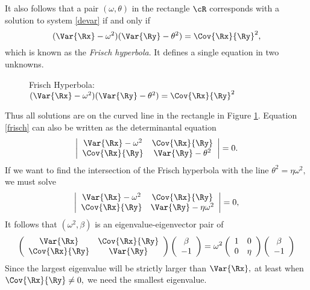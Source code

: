\documentclass[11pt]{report}
\begin{document}
It also follows that a pair  $(\omega,\theta)$ 
in the rectangle $\cR$ corresponds
with a solution to system \ref{devar} if and only if
\begin{equation}\label{frisch}
(\Var{\Rx}-\omega^2)(\Var{\Ry}-\theta^2)=\Cov{\Rx}{\Ry}^2,
\end{equation}
which is known as the \textit{Frisch hyperbola}. It defines a single equation
in two unknowns. 
\begin{figure}
   \centering
   \centerline{}
   \caption{Frisch Hyperbola:  $(\Var{\Rx}-\omega^2)(\Var{\Ry}-\theta^2)=
                                \Cov{\Rx}{\Ry}^2$\label{pict1}}
\end{figure}
Thus all solutions are on the curved line in the rectangle
in Figure \ref{pict1}. 
Equation \ref{frisch} can also be written as the determinantal equation
\begin{equation}\label{det}
\begin{array}|{cc}|
\Var{\Rx}-\omega^2&\Cov{\Rx}{\Ry}\\
\Cov{\Rx}{\Ry}&\Var{\Ry}-\theta^2
\end{array}
=0.
\end{equation}
If we want to find the intersection of the Frisch hyperbola with the line $\theta^2=\eta\omega^2,$
we must solve
\begin{equation}\label{det2}
\begin{array}|{cc}|
\Var{\Rx}-\omega^2&\Cov{\Rx}{\Ry}\\
\Cov{\Rx}{\Ry}&\Var{\Ry}-\eta\omega^2
\end{array}
=0,
\end{equation}
It follows that $(\omega^2,\beta)$ is an eigenvalue-eigenvector pair of 
\begin{equation}\label{arr2}
\begin{array}({cc})
\Var{\Rx}&\Cov{\Rx}{\Ry}\\
\Cov{\Rx}{\Ry}&\Var{\Ry}
\end{array}
\begin{array}({c})
\beta\\
-1
\end{array}
=\omega^2
\begin{array}({cc})
1&0\\
0&\eta
\end{array}
\begin{array}({c})
\beta\\
-1
\end{array}
\end{equation}
Since the largest eigenvalue will be strictly larger
than $\Var{\Rx},$ at least when $\Cov{\Rx}{\Ry}\not=0,$ we need
the smallest eigenvalue. 
\end{document}
